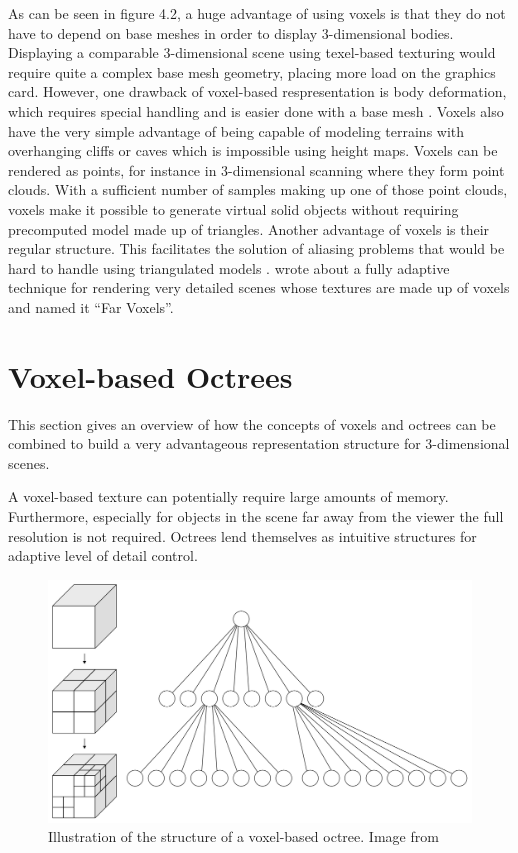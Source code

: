 As can be seen in figure 4.2, a huge advantage of using voxels is that they do not have to depend on base meshes in order to display 3-dimensional bodies. Displaying a comparable 3-dimensional scene using texel-based texturing would require quite a complex base mesh geometry, placing more load on the graphics card. However, one drawback of voxel-based respresentation is body deformation, which requires special handling and is easier done with a base mesh \cite{laine2011efficient}. Voxels also have the very simple advantage of being capable of modeling terrains with overhanging cliffs or caves which is impossible using height maps. Voxels can be rendered as points, for instance in 3-dimensional scanning where they form point clouds. With a sufficient number of samples making up one of those point clouds, voxels make it possible to generate virtual solid objects without requiring precomputed model made up of triangles. Another advantage of voxels is their regular structure. This facilitates the solution of aliasing problems that would be hard to handle using triangulated models \cite{Crassin:2009:GRS:1507149.1507152}. \cite{Gobbetti:2005:FVM:1073204.1073277} wrote about a fully adaptive technique for rendering very detailed scenes whose textures are made up of voxels and named it ``Far Voxels''.

\section{Voxel-based Octrees}

This section gives an overview of how the concepts of voxels and octrees can be combined to build a very advantageous representation structure for 3-dimensional scenes.

A voxel-based texture can potentially require large amounts of memory. Furthermore, especially for objects in the scene far away from the viewer the full resolution is not required. Octrees lend themselves as intuitive structures for adaptive level of detail control.

\begin{figure}[h]
  \begin{center}
    \includegraphics[width=.5\textwidth]{logos/voxel_octree_structure.png}
    \caption{Illustration of the structure of a voxel-based octree. Image from \cite{Wiki:Octree}}
  \end{center}
\end{figure}

